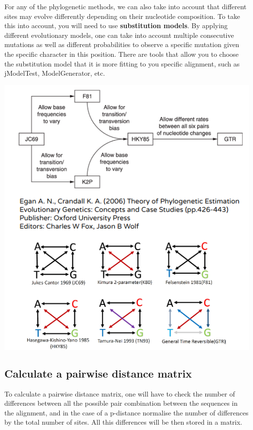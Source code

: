 \documentclass[
  letterpaper,
]{book}
\begin{document}
For any of the phylogenetic methods, we can also take into account that
different sites may evolve differently depending on their nucleotide
composition. To take this into account, you will need to use
\textbf{substitution models}. By applying different evolutionary models,
one can take into account multiple consecutive mutations as well as
different probabilities to observe a specific mutation given the
specific character in this position. There are tools that allow you to
choose the substitution model that it is more fitting to you specific
alignment, such as jModelTest, ModelGenerator, etc.

\includegraphics{assets/images/chapters/phylogenomics/7.png}

\hypertarget{calculate-a-pairwise-distance-matrix}{%
\subsection{Calculate a pairwise distance
matrix}\label{calculate-a-pairwise-distance-matrix}}

To calculate a pairwise distance matrix, one will have to check the
number of differences between all the possible pair combination between
the sequences in the alignment, and in the case of a p-distance
normalise the number of differences by the total number of sites. All
this differences will be then stored in a matrix.
\end{document}

